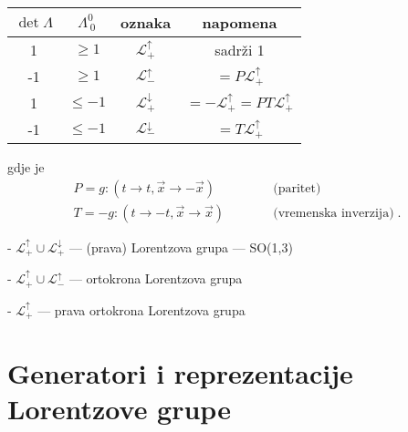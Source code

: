 \begin{center}
\begin{tabular}{cccc}
\hline
$\det\Lambda$ & $\Lambda^{0}_{\:0}$ & oznaka & napomena  \\ \hline
    1         &  $\geq 1$   & $\mathcal{L}^{\uparrow}_{+}$ & sadrži 1 \\
 -1           &  $\geq 1$   & $\mathcal{L}^{\uparrow}_{-}$ & 
$= P \mathcal{L}^{\uparrow}_{+} $ \\
 1           &  $\leq -1$   & $\mathcal{L}^{\downarrow}_{+}$ & 
$= - \mathcal{L}^{\uparrow}_{+} = PT \mathcal{L}^{\uparrow}_{+} $\\
 -1           &  $\leq -1$   & $\mathcal{L}^{\downarrow}_{-}$ & 
$= T \mathcal{L}^{\uparrow}_{+} $  \\ \hline
\end{tabular}
\end{center}
gdje je
\begin{align}
 P=g:  (t\to t, 
\vec{x}\to -\vec{x}) \qquad &\quad \text{(paritet)} \label{eq:paritet} \\
 T=-g:  (t\to -t, 
\vec{x}\to \vec{x}) \qquad  &\quad \text{(vremenska inverzija)} \;.
\end{align}

- $\mathcal{L}^{\uparrow}_{+} \cup \mathcal{L}^{\downarrow}_{+}$
 --- (prava) Lorentzova grupa --- SO(1,3)

- $\mathcal{L}^{\uparrow}_{+} \cup\mathcal{L}^{\uparrow}_{-}$
 --- ortokrona Lorentzova grupa

- $\mathcal{L}^{\uparrow}_{+}$ --- prava ortokrona Lorentzova grupa



\section{Generatori i reprezentacije Lorentzove grupe}

